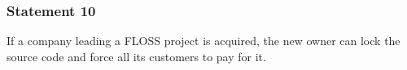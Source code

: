 \documentclass{beamer}
\begin{document}

\begin{frame}
 \frametitle{Statement 10}
 \begin{center}
  \begin{LARGE} If a company leading a FLOSS project is acquired, the new owner
can lock the source code and force all its customers to pay for it. \end{LARGE}
 \end{center}

\end{frame}
\end{document}
